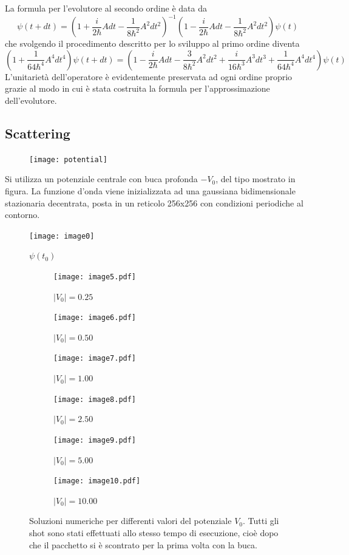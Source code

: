 La formula per l'evolutore al secondo ordine è data da
$$\psi(t+dt)=\left(1+\frac{i}{2\hbar}Adt-\frac{1}{8\hbar^2}A^2dt^2\right)^{-1}\left(1-\frac{i}{2\hbar}Adt-\frac{1}{8\hbar^2}A^2dt^2\right)\psi(t)$$
che svolgendo il procedimento descritto per lo sviluppo al primo ordine diventa
$$\left(1+\frac{1}{64\hbar^4}A^4dt^4\right)\psi(t+dt)=\left(1-\frac{i}{2\hbar}Adt-\frac{3}{8\hbar^2}A^2dt^2+\frac{i}{16\hbar^3}A^3dt^3+\frac{1}{64\hbar^4}A^4dt^4\right)\psi(t)$$
L'unitarietà dell'operatore è evidentemente preservata ad ogni ordine proprio grazie al modo in cui è stata costruita la formula per l'approssimazione dell'evolutore.


\subsection{Scattering}
\begin{figure}[H]
\centering
\texttt{[image: potential]}
\label{fig:potential}
\end{figure}
Si utilizza un potenziale centrale con buca profonda $-V_0$, del tipo mostrato in figura. La funzione d'onda viene inizializzata ad una gaussiana bidimensionale stazionaria decentrata, posta in un reticolo 256x256 con condizioni periodiche al contorno.
\begin{figure}[H]
\centering
\texttt{[image: image0]}
  \caption{$\psi(t_0)$}
\label{fig:image0}
\end{figure}


\begin{figure}[H]
 \begin{subfigure}[b]{0.32\textwidth}
  \centering
  \texttt{[image: image5.pdf]}
  \caption{$|V_0|=0.25$}
  \label{fig:image5}
 \end{subfigure}
 \begin{subfigure}[b]{0.32\textwidth}
  \centering
  \texttt{[image: image6.pdf]}
  \caption{$|V_0|=0.50$}
  \label{fig:image6}
 \end{subfigure}
 \begin{subfigure}[b]{0.32\textwidth}
  \centering
  \texttt{[image: image7.pdf]}
  \caption{$|V_0|=1.00$}
  \label{fig:image7}
 \end{subfigure}

 \quad

 \begin{subfigure}[b]{0.32\textwidth}
  \centering
  \texttt{[image: image8.pdf]}
  \caption{$|V_0|=2.50$}
  \label{fig:image8}
 \end{subfigure}
 \begin{subfigure}[b]{0.32\textwidth}
  \centering
  \texttt{[image: image9.pdf]}
  \caption{$|V_0|=5.00$}
  \label{fig:image9}
 \end{subfigure}
 \begin{subfigure}[b]{0.32\textwidth}
  \centering
  \texttt{[image: image10.pdf]}
  \caption{$|V_0|=10.00$}
  \label{fig:image10}
 \end{subfigure}

 \caption{Soluzioni numeriche per differenti valori del potenziale $V_0$. Tutti gli shot sono stati effettuati allo stesso tempo di esecuzione, cioè dopo che il pacchetto si è scontrato per la prima volta con la buca.}\label{fig:images_V0}
\end{figure}

